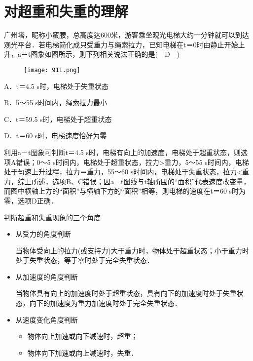 \documentclass[cn,11pt]{elegantbook}
\begin{document}
\section{对超重和失重的理解}
\begin{example}
   广州塔，昵称小蛮腰，总高度达600米，游客乘坐观光电梯大约一分钟就可以到达观光平台．若电梯简化成只受重力与绳索拉力，已知电梯在t＝0时由静止开始上升，a－t图象如图所示，则下列相关说法正确的是(　D　)

   \begin{figure}[htbp]
      \centering
      \texttt{[image: 911.png]}
   \end{figure}
   A．t＝4.5 s时，电梯处于失重状态
   
   B．5～55 s时间内，绳索拉力最小
   
   C．t＝59.5 s时，电梯处于超重状态
   
   D．t＝60 s时，电梯速度恰好为零   
   \begin{solution}
      利用a－t图象可判断t＝4.5 s时，电梯有向上的加速度，电梯处于超重状态，则选项A错误；0～5 s时间内，电梯处于超重状态，拉力>重力，5～55 s时间内，电梯处于匀速上升过程，拉力＝重力，55～60 s时间内，电梯处于失重状态，拉力<重力，综上所述，选项B、C错误；因a－t图线与t轴所围的“面积”代表速度改变量，而图中横轴上方的“面积”与横轴下方的“面积”相等，则电梯的速度在t＝60 s时为零，选项D正确．         
   \end{solution}
\end{example}

\begin{note}
   判断超重和失重现象的三个角度
   \begin{itemize}
      \item 从受力的角度判断
      
      当物体受向上的拉力(或支持力)大于重力时，物体处于超重状态；小于重力时处于失重状态，等于零时处于完全失重状态．
      \item 从加速度的角度判断
      
      当物体具有向上的加速度时处于超重状态，具有向下的加速度时处于失重状态，向下的加速度为重力加速度时处于完全失重状态．
      \item 从速度变化角度判断
      \begin{itemize}
         \item 物体向上加速或向下减速时，超重；
         \item 物体向下加速或向上减速时，失重．
      \end{itemize}
   \end{itemize}
   
\end{note}
\end{document}
